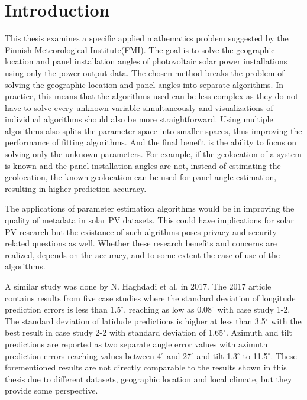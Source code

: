 \chapter{Introduction}


This thesis examines a specific applied mathematics problem suggested by the Finnish Meteorological Institute(FMI). The goal is to solve the geographic location and panel installation angles of photovoltaic solar power installations using only the power output data. The chosen method breaks the problem of solving the geographic location and panel angles into separate algorithms. In practice, this means that the algorithms used can be less complex as they do not have to solve every unknown variable simultaneously and visualizations of individual algorithms should also be more straightforward. Using multiple algorithms also splits the parameter space into smaller spaces, thus improving the performance of fitting algorithms. And the final benefit is the ability to focus on solving only the unknown parameters. For example, if the geolocation of a system is known and the panel installation angles are not, instead of estimating the geolocation, the known geolocation can be used for panel angle estimation, resulting in higher prediction accuracy.




The applications of parameter estimation algorithms would be in improving the quality of metadata in solar PV datasets. This could have implications for solar PV research but the existance of such algrithms poses privacy and security related questions as well. Whether these research benefits and concerns are realized, depends on the accuracy, and to some extent the ease of use of the algorithms.


A similar study was done by N. Haghdadi et al. in 2017\cite{navid_australian_article}. The 2017 article contains results from five case studies where the standard deviation of longitude prediction errors is less than $1.5^\circ$, reaching as low as $0.08^\circ$ with case study 1-2. The standard deviation of latidude predictions is higher at less than 3.5$^\circ$ with the best result in case study 2-2 with standard deviation of 1.65$^\circ$. Azimuth and tilt predictions are reported as two separate angle error values with azimuth prediction errors reaching values between 4$^\circ$ and 27$^\circ$ and tilt 1.3$^\circ$ to 11.5$^\circ$. These forementioned results are not directly comparable to the results shown in this thesis due to different datasets, geographic location and local climate, but they provide some perspective.





